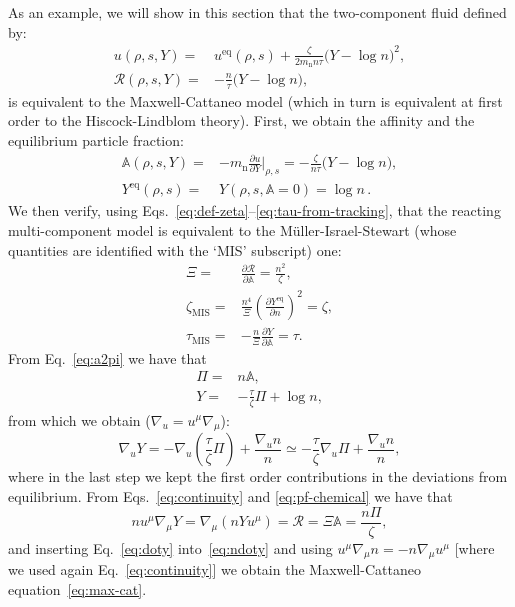 \documentclass[aps,prd,twocolumn,a4paper,floatfix,nofootbib,superscriptaddress,nofootinbib]{revtex4}
\newcommand{\rn}{\mathrm{n}}
\newcommand{\req}{\mathrm{eq}}
\begin{document}
As an example, we will show in this section that the two-component fluid defined by:
%
\begin{align}
u(\rho,s,Y)={}&u^\req(\rho,s) + \frac{\zeta}{2m_\rn n\tau}\big(Y-\log n\big)^2,\\
\mathcal R(\rho,s,Y)={}&-\frac{n}{\tau}\big(Y-\log n\big),
\end{align}
%
is equivalent to the Maxwell-Cattaneo model (which in turn is equivalent at
first order to the Hiscock-Lindblom theory). First, we obtain the affinity and
the equilibrium particle fraction:
%
\begin{align}
\mathbb A(\rho,s,Y)={}&-m_\rn\frac{\partial u}{\partial Y} \bigg|_{\rho,s}= -\frac{\zeta}{n\tau}\big(Y-\log n\big),\\
Y^\req(\rho,s)={}&Y(\rho,s,\mathbb A=0)=\log n \, .
\end{align}
%
We then verify, using Eqs.~\eqref{eq:def-zeta}--\eqref{eq:tau-from-tracking},
that the reacting multi-component model is equivalent to the M\"uller-Israel-Stewart (whose quantities
are identified with the `MIS' subscript) one:
%
\begin{align}
\Xi={}&\frac{\partial \mathcal R}{\partial \mathbb A}=\frac{n^2}{\zeta},\\
\zeta_{\text{MIS}}={}& \frac{n^4}{\Xi}\left(\frac{\partial Y^\req}{\partial n}\right)^2=\zeta,\\
\tau_{\text{MIS}}={}& -\frac{n}{\Xi}\frac{\partial Y}{\partial \mathbb A}=\tau.
\end{align}
%
From Eq.~\eqref{eq:a2pi} we have that
%
\begin{align}
\Pi={}& n\mathbb A,\\
Y={}& -\frac{\tau}{\zeta}\Pi + \log n,
\end{align}
%
from which we obtain ($\nabla_u= u^\mu\nabla_\mu$):
%
\begin{equation}
\label{eq:doty}
\nabla_u Y= -\nabla_u{\left(\frac{\tau}{\zeta}\Pi\right)} + \frac{\nabla_u n}{n}\simeq
-\frac{\tau}{\zeta}\nabla_u\Pi + \frac{\nabla_u n}{n},
\end{equation}
%
where in the last step we kept the first order contributions in the deviations from equilibrium.
From Eqs.~\eqref{eq:continuity} and \eqref{eq:pf-chemical} we have that
%
\begin{equation}
\label{eq:ndoty}
nu^\mu\nabla_\mu Y=\nabla_\mu(nYu^\mu)
= \mathcal R= \Xi \mathbb A=\frac{n\Pi}{\zeta},
\end{equation}
%
and inserting Eq.~\eqref{eq:doty} into~\eqref{eq:ndoty} and using $u^\mu\nabla_\mu n=- n\nabla_\mu u^\mu$
[where we used again Eq.~\eqref{eq:continuity}] we obtain the Maxwell-Cattaneo equation~\eqref{eq:max-cat}.
\end{document}
